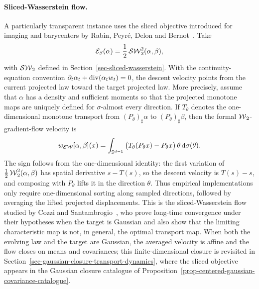 \paragraph{Sliced-Wasserstein flow.}

A particularly transparent instance uses the sliced objective introduced for imaging and barycenters by Rabin, Peyr\'e, Delon and Bernot~\cite{rabin-ssvm-11}. Take
\[
	\mathcal E_\beta(\alpha)=\frac12\operatorname{\mathcal{SW}}_2^2(\alpha,\beta),
\]
with $\operatorname{\mathcal{SW}}_2$ defined in Section~\ref{sec-sliced-wasserstein}. With the continuity-equation convention $\partial_t\alpha_t+\operatorname{div}(\alpha_t w_t)=0$, the descent velocity points from the current projected law toward the target projected law. More precisely, assume that $\alpha$ has a density and sufficient moments so that the projected monotone maps are uniquely defined for $\sigma$-almost every direction. If $T_\theta$ denotes the one-dimensional monotone transport from $(P_\theta)_\sharp\alpha$ to $(P_\theta)_\sharp\beta$, then the formal $\operatorname{\mathcal{W}}_2$-gradient-flow velocity is
\begin{equation}\label{eq-sliced-wasserstein-flow-velocity}
	w_{\operatorname{\mathcal{SW}}}[\alpha,\beta](x)
	=
	\int_{\mathbb{S}^{d-1}}
	\big(T_\theta(P_\theta x)-P_\theta x\big)\,\theta\,\mathrm{d}\sigma(\theta).
\end{equation}
The sign follows from the one-dimensional identity: the first variation of $\frac12\operatorname{\mathcal{W}}_2^2(\alpha,\beta)$ has spatial derivative $s-T(s)$, so the descent velocity is $T(s)-s$, and composing with $P_\theta$ lifts it in the direction $\theta$.
Thus empirical implementations only require one-dimensional sorting along sampled directions, followed by averaging the lifted projected displacements. This is the sliced-Wasserstein flow studied by Cozzi and Santambrogio~\cite{CozziSantambrogio2024SlicedFlow}, who prove long-time convergence under their hypotheses when the target is Gaussian and also show that the limiting characteristic map is not, in general, the optimal transport map. When both the evolving law and the target are Gaussian, the averaged velocity is affine and the flow closes on means and covariances; this finite-dimensional closure is revisited in Section~\ref{sec-gaussian-closure-transport-dynamics}, where the sliced objective appears in the Gaussian closure catalogue of Proposition~\ref{prop-centered-gaussian-covariance-catalogue}.

